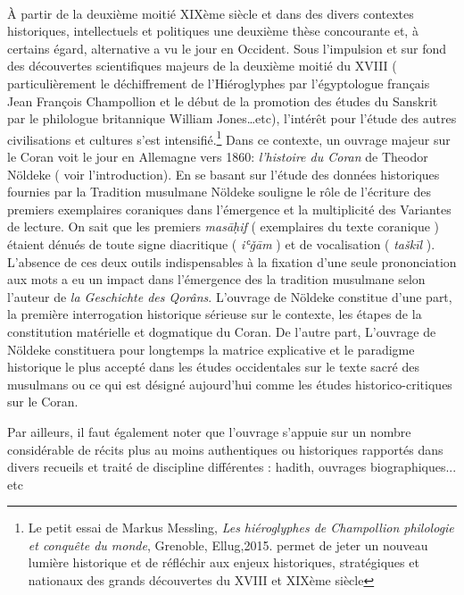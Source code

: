 \documentclass[a4paper,12pt]{report}
\begin{document}
\begin{itemize}
\paragraph{}
À  partir de la deuxième moitié  XIXème siècle et dans des divers contextes historiques, intellectuels et politiques une  deuxième thèse concourante et, à certains égard, alternative a vu le jour en Occident. Sous l’impulsion et sur fond  des  découvertes scientifiques majeurs de la deuxième moitié du XVIII ( particulièrement le déchiffrement de l’Hiéroglyphes par  l’égyptologue français Jean François Champollion et le début de la promotion des études du Sanskrit par le philologue britannique William Jones…etc),  l’intérêt pour l'étude des  autres civilisations et cultures  s’est intensifié.\footnote{ Le petit essai  de Markus Messling,\textit{ Les hiéroglyphes de Champollion philologie et conquête du monde}, Grenoble, Ellug,2015. permet de jeter un nouveau lumière historique et de réfléchir aux enjeux historiques, stratégiques et nationaux des grands découvertes du XVIII et XIXème siècle }  
 Dans ce contexte, un ouvrage majeur  sur le Coran voit le jour en Allemagne vers 1860: \textit{l'histoire du Coran} de Theodor Nöldeke ( voir l'introduction). En se basant sur l'étude  des données historiques fournies par la Tradition musulmane Nöldeke souligne le rôle de l'écriture des premiers exemplaires coraniques dans l'émergence et la multiplicité des Variantes de lecture.  
 On sait que les premiers\textit{ masāḥif} ( exemplaires du texte coranique )  étaient dénués de toute signe diacritique ( \textit{iʿǧām} )  et de vocalisation ( \textit{taškīl }). L’absence de ces deux outils indispensables à la fixation  d’une seule prononciation aux mots a eu un impact dans l’émergence  des la tradition musulmane selon l'auteur de \textit{la Geschichte des Qorâns}. L'ouvrage de Nöldeke constitue d'une part, la première interrogation historique sérieuse sur le contexte, les étapes de la constitution matérielle et dogmatique du Coran. 
 De l'autre part,  L'ouvrage de Nöldeke  constituera pour longtemps la matrice explicative et le paradigme historique le plus accepté dans les études occidentales sur le texte sacré des musulmans ou  ce qui est désigné aujourd'hui comme les études historico-critiques sur le Coran.   
 
 Par ailleurs, il faut également noter que l'ouvrage s'appuie sur un nombre considérable de récits plus au moins authentiques ou historiques rapportés dans divers recueils et traité de discipline différentes : hadith, ouvrages biographiques... etc 


\end{itemize}
\end{document}
